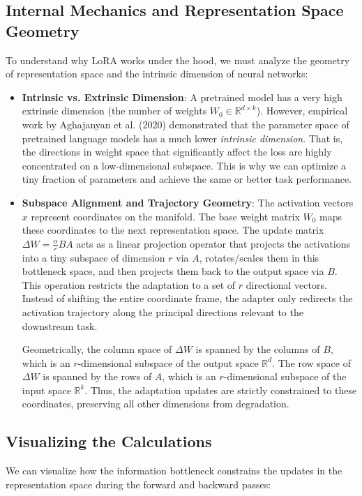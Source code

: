 \documentclass{article}
\begin{document}
\subsection{Internal Mechanics and Representation Space Geometry}
To understand why LoRA works under the hood, we must analyze the geometry of representation space and the intrinsic dimension of neural networks:
\begin{itemize}
  \item \textbf{Intrinsic vs. Extrinsic Dimension}: A pretrained model has a very high extrinsic dimension (the number of weights $W_0 \in \mathbb{R}^{d \times k}$). However, empirical work by Aghajanyan et al. (2020) demonstrated that the parameter space of pretrained language models has a much lower \textit{intrinsic dimension}. That is, the directions in weight space that significantly affect the loss are highly concentrated on a low-dimensional subspace. This is why we can optimize a tiny fraction of parameters and achieve the same or better task performance.
  \item \textbf{Subspace Alignment and Trajectory Geometry}: The activation vectors $x$ represent coordinates on the manifold. The base weight matrix $W_0$ maps these coordinates to the next representation space. The update matrix $\Delta W = \frac{\alpha}{r} B A$ acts as a linear projection operator that projects the activations into a tiny subspace of dimension $r$ via $A$, rotates/scales them in this bottleneck space, and then projects them back to the output space via $B$. This operation restricts the adaptation to a set of $r$ directional vectors. Instead of shifting the entire coordinate frame, the adapter only redirects the activation trajectory along the principal directions relevant to the downstream task.
  
  Geometrically, the column space of $\Delta W$ is spanned by the columns of $B$, which is an $r$-dimensional subspace of the output space $\mathbb{R}^{d}$. The row space of $\Delta W$ is spanned by the rows of $A$, which is an $r$-dimensional subspace of the input space $\mathbb{R}^{k}$. Thus, the adaptation updates are strictly constrained to these coordinates, preserving all other dimensions from degradation.
\end{itemize}

\subsection{Visualizing the Calculations}
We can visualize how the information bottleneck constrains the updates in the representation space during the forward and backward passes:
\end{document}
